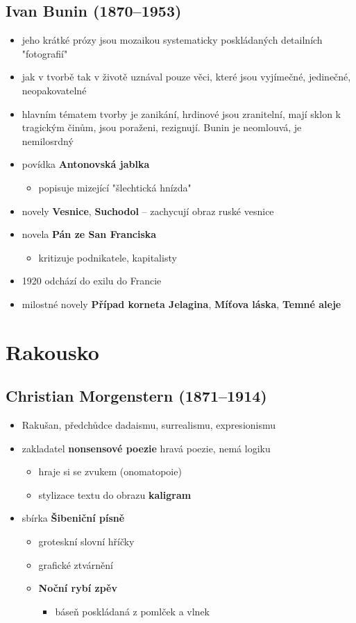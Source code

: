 \subsection{Ivan Bunin (1870--1953)}
\begin{itemize}
\item jeho krátké prózy jsou mozaikou systematicky poskládaných detailních "fotografií" 
\item jak v tvorbě tak v životě uznával pouze věci, které jsou vyjímečné, jedinečné, neopakovatelné
\item hlavním tématem tvorby je zanikání, hrdinové jsou zranitelní, mají sklon k tragickým činům, jsou poraženi, rezignují. Bunin je neomlouvá, je nemilosrdný
\item povídka \textbf{Antonovská jablka}
	\begin{itemize}
	\item popisuje mizející "šlechtická hnízda" 
	\end{itemize}
\item novely \textbf{Vesnice}, \textbf{Suchodol} -- zachycují obraz ruské vesnice
\item novela \textbf{Pán ze San Franciska}
	\begin{itemize}
	\item kritizuje podnikatele, kapitalisty
	\end{itemize}
\item 1920 odchází do exilu do Francie
\item milostné novely \textbf{Případ korneta Jelagina}, \textbf{Míťova láska}, \textbf{Temné aleje}

\end{itemize}


\section{Rakousko}
\subsection{Christian Morgenstern (1871--1914)}
\begin{itemize}
\item Rakušan, předchůdce dadaismu, surrealismu, expresionismu
\item zakladatel\textbf{ nonsensové poezie }\ra hravá poezie, nemá logiku
	\begin{itemize}
	\item hraje si se zvukem (onomatopoie)
	\item stylizace textu do obrazu \ra \textbf{kaligram}
	\end{itemize}
\item sbírka \textbf{Šibeniční písně}
	\begin{itemize}
	\item groteskní slovní hříčky
	\item grafické ztvárnění
	\item \textbf{Noční rybí zpěv}
		\begin{itemize}
		\item báseň poskládaná z pomlček a vlnek
		\end{itemize}
	\end{itemize}
\end{itemize}

